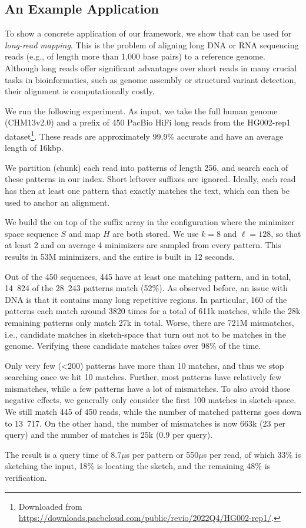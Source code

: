 \subsection{An Example Application}\label{sec:application}

To show a concrete application of our framework, we show that {\uindex} can be
used for \textit{long-read mapping}.
This is the problem of aligning long DNA or RNA sequencing reads (e.g., of length more than 1,000 base pairs) to a
reference genome.
Although long reads offer significant advantages over short reads in many
crucial tasks in bioinformatics,
such as genome assembly or structural variant detection,
their alignment is computationally costly.

We run the following experiment.
As input, we take the full human genome (CHM13v2.0) and
a prefix of 450 PacBio HiFi long reads from the HG002-rep1 dataset\footnote{Downloaded from
\url{https://downloads.pacbcloud.com/public/revio/2022Q4/HG002-rep1/}.}.
These reads are approximately 99.9\% accurate and have an average length of
16kbp.

We partition (chunk) each read into patterns of length 256, and search each
of these patterns in our index. Short leftover suffixes are ignored.
Ideally, each read has then at least one pattern that
exactly matches the text, which can then be used to anchor an alignment.

We build the {\uindex} on top of the  suffix array in the
configuration where the minimizer space sequence $S$ and map $H$ are both stored.
We use $k=8$ and $\ell=128$, so that at least 2 and on average 4 minimizers are
sampled from every pattern.
This results in 53M minimizers, and the entire {\uindex} is built in 12 seconds.

Out of the 450 sequences, 445 have at least one matching pattern, and in total,
14\ 824 of the 28\ 243 patterns match (52\%).
As observed before, an issue with DNA is that it contains many long repetitive
regions. In particular, 160 of the patterns each match around 3820 times for a
total of 611k matches, while the 28k remaining patterns only match 27k in total.
Worse, there are 721M mismatches, i.e., candidate matches in sketch-space that
turn out not to be matches in the genome. Verifying these candidate matches
takes over 98\% of the time.

Only very few (<200) patterns have more than 10 matches, and thus we stop
searching once we hit 10 matches. Further, most patterns have
relatively few mismatches, while a few patterns have a lot of mismatches. To
also avoid those negative effects, we generally only consider the first 100
matches in sketch-space. We still match 445 of 450 reads, while the number
of matched patterns goes down to 13\ 717. On the other hand, the number of
mismatches is now 663k (23 per query) and the number of matches is 25k (0.9 per
query).

The result is a query time of 8.7$\mu$s per pattern or 550$\mu$s per read, of which 33\% is sketching
the input, 18\% is locating the sketch, and the remaining 48\% is verification.